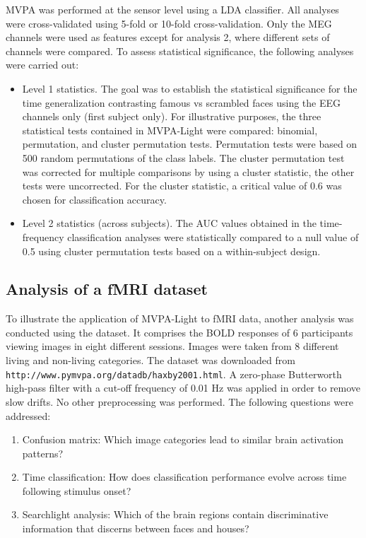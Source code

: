 \documentclass[utf8]{frontiersSCNS} %
\newcommand{\ttt}[1]{\texttt{#1}}
\begin{document}
MVPA was performed at the sensor level using a LDA classifier. All analyses were cross-validated using 5-fold or 10-fold cross-validation. Only the MEG channels were used as features except for analysis 2, where different sets of channels were compared. To assess statistical significance, the following analyses were carried out:

\begin{itemize}
    \item Level 1 statistics. The goal was to establish the statistical significance for the time generalization contrasting famous vs scrambled faces using the EEG channels only (first subject only). For illustrative purposes, the three statistical tests contained in MVPA-Light were compared: binomial, permutation, and cluster permutation tests. Permutation tests were based on 500 random permutations of the class labels. The cluster permutation test was corrected for multiple comparisons by using a cluster statistic, the other tests were uncorrected. For the cluster statistic, a critical value of 0.6 was chosen for  classification accuracy.
    \item Level 2 statistics (across subjects). The AUC values obtained in the time-frequency classification analyses were statistically compared to a null value of 0.5 using cluster permutation tests based on a within-subject design.

\end{itemize}

\subsection{Analysis of a fMRI dataset}
To illustrate the application of MVPA-Light to fMRI data, another analysis was conducted using the \cite{Haxby2001} dataset. It comprises the BOLD responses of 6 participants viewing images in eight different sessions. Images were taken from 8 different living and non-living categories. The dataset was downloaded from \ttt{http://www.pymvpa.org/datadb/haxby2001.html}. A zero-phase Butterworth high-pass filter with a cut-off frequency of 0.01 Hz was applied in order to remove slow drifts. No other preprocessing was performed. The following questions were addressed:

\begin{enumerate}
    \item Confusion matrix: Which image categories lead to similar brain activation patterns?
    \item Time classification: How does classification performance evolve across time following stimulus onset?
    \item Searchlight analysis: Which of the brain regions contain discriminative information that discerns between faces and houses?
\end{enumerate}
\end{document}
